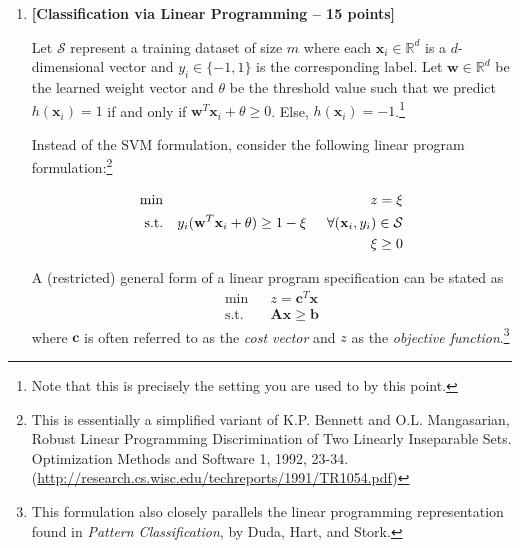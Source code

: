 \documentclass[12pt,letterpaper]{article}
\begin{document}
\begin{enumerate}
\item
{\bf [Classification via Linear Programming -- 15 points]}

Let $\mathcal{S}$ represent a training dataset of size $m$ where each $\mathbf{x}_i \in \mathbb{R}^d$ is a $d$-dimensional vector and $y_i \in \{-1, 1\}$ is the corresponding label.  Let $\mathbf{w} \in \mathbb{R}^d$ be the learned weight vector and $\theta$ be the threshold value such that we predict $h(\mathbf{x}_i) = 1$ if and only if $\mathbf{w}^T \mathbf{x}_i + \theta \geq 0$.  Else, $h(\mathbf{x}_i) = -1$.\footnote{Note that this is precisely the setting you are used to by this point.}

Instead of the SVM formulation, consider the following linear program formulation:\footnote{This is essentially a simplified variant of K.P. Bennett and O.L. Mangasarian, Robust Linear Programming Discrimination of Two Linearly Inseparable Sets. Optimization Methods and Software 1, 1992, 23-34. (\url{http://research.cs.wisc.edu/techreports/1991/TR1054.pdf})}

\begin{eqnarray}
\min & & z = \xi \\
\mbox{s.t.} & & y_i (\mathbf{w}^T \mathbf{x}_i + \theta) \geq 1 - \xi \hspace{0.2in} \forall (\mathbf{x}_i, y_i) \in \mathcal{S} \label{eqn:constraints} \\
& & \xi \geq 0
\end{eqnarray}


A (restricted) general form of a linear program specification can be stated as
%
\begin{eqnarray}
\min & & z = \mathbf{c}^T \mathbf{x} \\
\mbox{s.t.} & & \mathbf{A} \mathbf{x} \geq \mathbf{b}
\end{eqnarray}
%
where $\mathbf{c}$ is often referred to as the {\em cost vector} and $z$ as the {\em objective function}.\footnote{This formulation also closely parallels the linear programming representation found in {\em Pattern Classification}, by Duda, Hart, and Stork.}


\end{enumerate}
\end{document}
